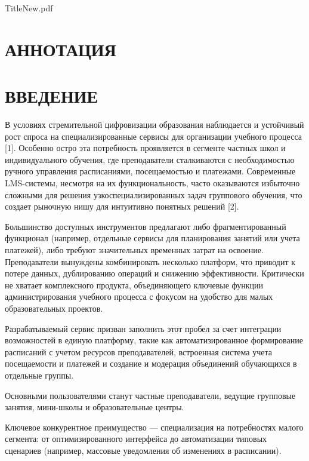 \documentclass[a4paper,14pt,oneside]{extreport}
\begin{document}

  {TitleNew.pdf}
\newpage
\chapter*{АННОТАЦИЯ}



\setcounter{tocdepth}{1} 
\newpage\tableofcontents\thispagestyle{plain}
\newpage\pagestyle{fancy}\setcounter{page}{8}

\chapter*{ВВЕДЕНИЕ}

В условиях стремительной цифровизации образования наблюдается и устойчивый рост спроса на специализированные сервисы для организации учебного процесса [1]. Особенно остро эта потребность проявляется в сегменте частных школ и индивидуального обучения, где преподаватели сталкиваются с необходимостью ручного управления расписаниями, посещаемостью и платежами. Современные LMS-системы, несмотря на их функциональность, часто оказываются избыточно сложными для решения узкоспециализированных задач группового обучения, что создает рыночную нишу для интуитивно понятных решений [2].

Большинство доступных инструментов предлагают либо фрагментированный функционал (например, отдельные сервисы для планирования занятий или учета платежей), либо требуют значительных временных затрат на освоение. Преподаватели вынуждены комбинировать несколько платформ, что приводит к потере данных, дублированию операций и снижению эффективности. Критически не хватает комплексного продукта, объединяющего ключевые функции администрирования учебного процесса с фокусом на удобство для малых образовательных проектов.

Разрабатываемый сервис призван заполнить этот пробел за счет интеграции  возможностей в единую платформу, такие как автоматизированное формирование расписаний с учетом ресурсов преподавателей, встроенная система учета посещаемости и платежей и создание и модерация объединений обучающихся в отдельные группы.

Основными пользователями станут частные преподаватели, ведущие групповые занятия, мини-школы и образовательные центры.

Ключевое конкурентное преимущество — специализация на потребностях малого сегмента: от оптимизированного интерфейса до автоматизации типовых сценариев (например, массовые уведомления об изменениях в расписании).
\end{document}
